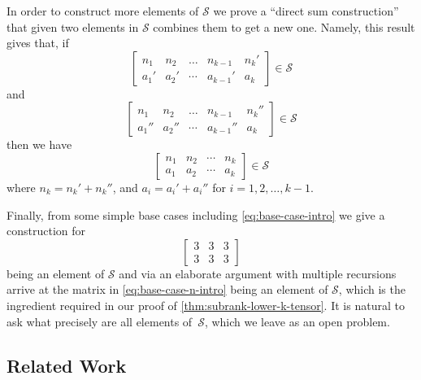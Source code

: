 \documentclass[11pt]{article}
\theoremstyle{definition}
\theoremstyle{remark}
\begin{document}
In order to construct more elements of $\mathcal{S}$ we prove a ``direct sum construction'' that given two elements in $\mathcal{S}$ combines them to get a new one. Namely, this result gives that, if
\[
\begin{bmatrix} n_1 & n_2 & \dots & n_{k-1} & n_k'\\
a_1' & a_2' & \cdots & a_{k-1}' & a_k\end{bmatrix} \in \mathcal{S}
\]
and
\[
\begin{bmatrix} n_1 & n_2 & \dots & n_{k-1} & n_k''\\
a_1'' & a_2'' & \cdots & a_{k-1}'' & a_k\end{bmatrix} \in \mathcal{S}
\]
then we have 
\[
\begin{bmatrix} 
n_1 & n_2 & \cdots & n_k\\
a_1 & a_2  & \cdots & a_k
\end{bmatrix}\in \mathcal{S}
\]
where $n_k=n_k'+n_k''$, and $a_i=a_i'+a_i''$ for $i=1,2,\dots,k-1$.

Finally, from some simple base cases including \eqref{eq:base-case-intro} we give a construction for 
\[ 
\begin{bmatrix} 3 & 3 & 3\\3 & 3 & 3\end{bmatrix}
\] 
being an element of $\mathcal{S}$
and via an elaborate argument with multiple recursions arrive at the matrix in \eqref{eq:base-case-n-intro} being an element of $\mathcal{S}$, which is the ingredient required in our proof of \autoref{thm:subrank-lower-k-tensor}. It is natural to ask what precisely are all elements of~$\mathcal{S}$, which we leave as an open problem.


\subsection{Related Work}\label{subsec:related}
\end{document}
